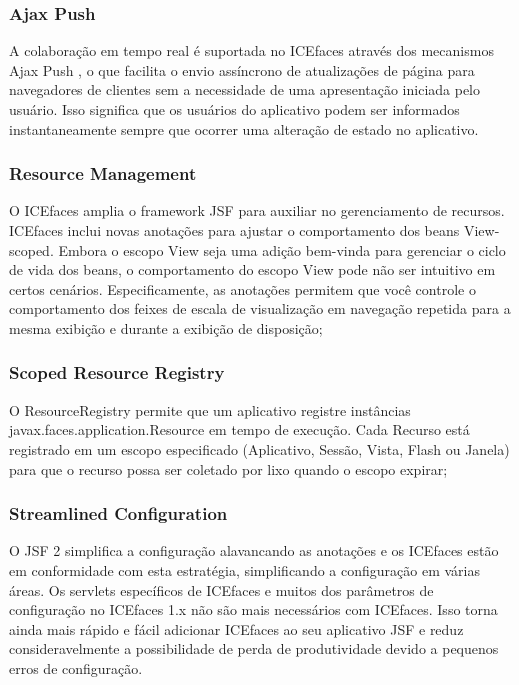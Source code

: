 \documentclass[12pt,a4paper]{article}
\begin{document}
\subsubsection{Ajax Push}
A colaboração em tempo real é suportada no ICEfaces através dos mecanismos Ajax Push , o que facilita o envio assíncrono de atualizações de página para navegadores de clientes sem a necessidade de uma apresentação iniciada pelo usuário. Isso significa que os usuários do aplicativo podem ser informados instantaneamente sempre que ocorrer uma alteração de estado no aplicativo.

\subsubsection{Resource Management}
O ICEfaces amplia o framework JSF para auxiliar no gerenciamento de recursos. ICEfaces inclui novas anotações para ajustar o comportamento dos beans View-scoped. Embora o escopo View seja uma adição bem-vinda para gerenciar o ciclo de vida dos beans, o comportamento do escopo View pode não ser intuitivo em certos cenários. Especificamente, as anotações permitem que você controle o comportamento dos feixes de escala de visualização em navegação repetida para a mesma exibição e durante a exibição de disposição;

\subsubsection{Scoped Resource Registry}
O ResourceRegistry permite que um aplicativo registre instâncias javax.faces.application.Resource em tempo de execução. Cada Recurso está registrado em um escopo especificado (Aplicativo, Sessão, Vista, Flash ou Janela) para que o recurso possa ser coletado por lixo quando o escopo expirar;

\subsubsection{Streamlined Configuration}
O JSF 2 simplifica a configuração alavancando as anotações e os ICEfaces estão em conformidade com esta estratégia, simplificando a configuração em várias áreas. Os servlets específicos de ICEfaces e muitos dos parâmetros de configuração no ICEfaces 1.x não são mais necessários com ICEfaces. Isso torna ainda mais rápido e fácil adicionar ICEfaces ao seu aplicativo JSF e reduz consideravelmente a possibilidade de perda de produtividade devido a pequenos erros de configuração.
\end{document}
